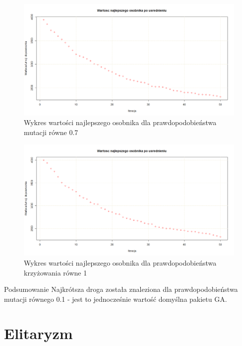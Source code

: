 \documentclass{article}
\begin{document}
\begin{figure}[H]
\centering

\includegraphics[scale=0.3]{IO_obrazy/bay29_mu_07}
\caption{Wykres wartości najlepszego osobnika dla prawdopodobieństwa mutacji równe 0.7}
\end{figure}


\begin{figure}[H]
\centering

\includegraphics[scale=0.3]{IO_obrazy/bay29_mu_1}
\caption{Wykres wartości najlepszego osobnika dla prawdopodobieństwa krzyżowania równe 1}
\end{figure}

Podsumowanie Najkrótsza droga została znaleziona dla prawdopodobieństwa mutacji równego 0.1 - jest to jednocześnie wartość domyślna pakietu GA.


\newpage

\section{Elitaryzm}
\end{document}
